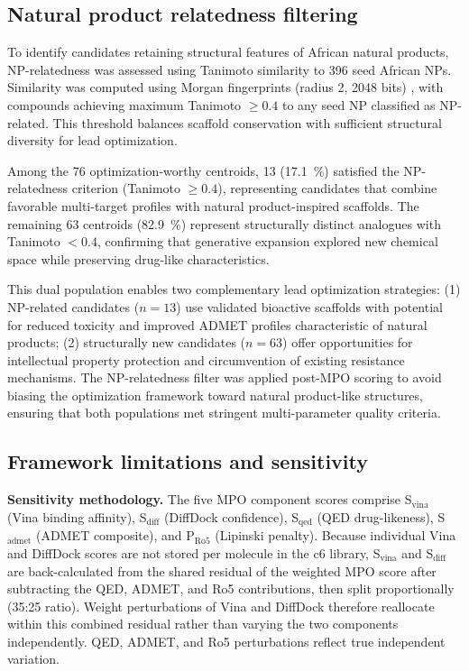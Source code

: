 \documentclass[journal=jcisd8,manuscript=suppinfo]{achemso}
\begin{document}
\subsection*{Natural product relatedness filtering}

To identify candidates retaining structural features of African natural products, NP-relatedness was assessed using Tanimoto similarity to \num{396} seed African NPs. Similarity was computed using Morgan fingerprints (radius \num{2}, \num{2048} bits) \cite{Rogers2010}, with compounds achieving maximum Tanimoto $\geq \num{0.4}$ to any seed NP classified as NP-related. This threshold balances scaffold conservation with sufficient structural diversity for lead optimization.

Among the \num{76} optimization-worthy centroids, \num{13} (\qty{17.1}{\percent}) satisfied the NP-relatedness criterion (Tanimoto $\geq \num{0.4}$), representing candidates that combine favorable multi-target profiles with natural product-inspired scaffolds. The remaining \num{63} centroids (\qty{82.9}{\percent}) represent structurally distinct analogues with Tanimoto $< \num{0.4}$, confirming that generative expansion explored new chemical space while preserving drug-like characteristics.

This dual population enables two complementary lead optimization strategies: (1) NP-related candidates ($n = \num{13}$) use validated bioactive scaffolds with potential for reduced toxicity and improved ADMET profiles characteristic of natural products; (2) structurally new candidates ($n = \num{63}$) offer opportunities for intellectual property protection and circumvention of existing resistance mechanisms. The NP-relatedness filter was applied post-MPO scoring to avoid biasing the optimization framework toward natural product-like structures, ensuring that both populations met stringent multi-parameter quality criteria.

\subsection*{Framework limitations and sensitivity}

\label{sec:mpo_sensitivity_methods}

\textbf{Sensitivity methodology.} The five MPO component scores comprise S$_{\text{vina}}$ (Vina binding affinity), S$_{\text{diff}}$ (DiffDock confidence), S$_{\text{qed}}$ (QED drug-likeness), S$_{\text{admet}}$ (ADMET composite), and P$_{\text{Ro5}}$ (Lipinski penalty). Because individual Vina and DiffDock scores are not stored per molecule in the c6 library, S$_{\text{vina}}$ and S$_{\text{diff}}$ are back-calculated from the shared residual of the weighted MPO score after subtracting the QED, ADMET, and Ro5 contributions, then split proportionally (35:25 ratio). Weight perturbations of Vina and DiffDock therefore reallocate within this combined residual rather than varying the two components independently. QED, ADMET, and Ro5 perturbations reflect true independent variation.
\end{document}
